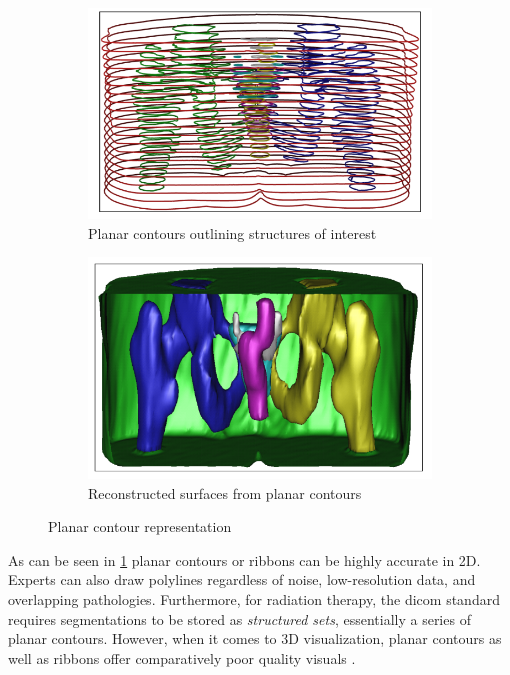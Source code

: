 \begin{figure}[h]
	\begin{subfigure}{0.49\textwidth}
		\includegraphics[scale=0.5]{images/planarContours.png}
		\caption{Planar contours outlining structures of interest}\label{fig:planarContoursLines}
	\end{subfigure}
	\begin{subfigure}{0.49\textwidth}
		\includegraphics[scale=0.5]{images/planarContoursRecon.png}
		\caption{Reconstructed surfaces from planar contours}\label{fig:planarRec}
	\end{subfigure}
	\caption{Planar contour representation \cite{weinsteinScanlineSurfacingBuilding2000}}\label{fig:planarContours}
\end{figure}

\noindent
As can be seen in \cref{fig:planarContoursLines} planar contours or ribbons can be highly accurate in 2D.
Experts can also draw polylines regardless of noise, low-resolution data, and overlapping pathologies.
Furthermore, for radiation therapy, the \gls{dicom} standard requires segmentations to be stored as \textit{structured sets},
essentially a series of planar contours.
However, when it comes to 3D visualization, planar contours as well as ribbons offer comparatively poor quality visuals \cite{pinterPolymorphSegmentationRepresentation2019,weinsteinScanlineSurfacingBuilding2000}.


